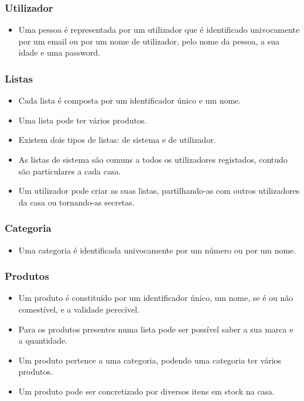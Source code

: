 \subsubsection{Utilizador}
\begin{itemize}
	\item Uma pessoa é representada por um utilizador que é identificado univocamente por um email ou por um nome de utilizador, pelo nome da pessoa, a sua idade e uma password.
\end{itemize}

\subsubsection{Listas}
\begin{itemize}
	\item Cada lista é composta por um identificador único e um nome.
	\item Uma lista pode ter vários produtos.
	\item Existem dois tipos de listas: de sistema e de utilizador. 
	\item As listas de sistema são comuns a todos os utilizadores registados, contudo são particulares a cada casa. 
	\item Um utilizador pode criar as suas listas, partilhando-as com outros utilizadores da casa ou tornando-as secretas.
\end{itemize}

\subsubsection{Categoria}
\begin{itemize}
	\item Uma categoria é identificada univocamente por um número ou por um nome.
\end{itemize}


\subsubsection{Produtos}
\begin{itemize}
	\item Um produto é constituído por um identificador único, um nome, se é ou não comestível, e a validade perecível.
	\item Para os produtos presentes numa lista pode ser possível saber a sua marca e a quantidade.
	\item Um produto pertence a uma categoria, podendo uma categoria ter vários produtos.
	\item Um produto pode ser concretizado por diversos itens em stock na casa.
\end{itemize}
 
